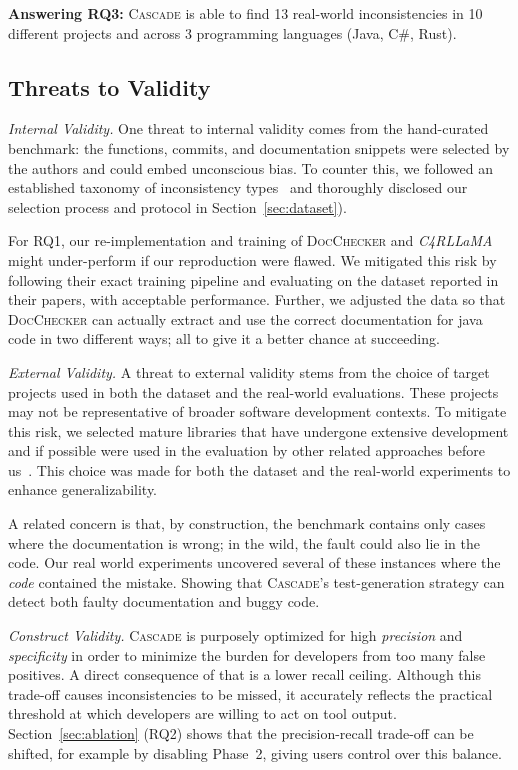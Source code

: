\documentclass[acmsmall, screen]{acmart}
\newcommand{\tool}{\textsc{Cascade}\xspace}
\begin{document}
\begin{tcolorbox}[mystyle]
\textbf{Answering RQ3:} \tool is able to find 13 real-world inconsistencies in 10 different projects and across 3 programming languages (Java, C\#, Rust).
\end{tcolorbox}

\subsection{Threats to Validity}

\emph{Internal Validity.}
One threat to internal validity comes from the hand-curated benchmark: the functions, commits, and documentation snippets were selected by the authors and could embed unconscious bias. To counter this, we followed an established taxonomy of inconsistency types~\cite{wen2019large} and thoroughly disclosed our selection process and protocol in Section~\ref{sec:dataset}).

For RQ1, our re-implementation and training of \textsc{DocChecker} and \textit{C4RLLaMA} might under-perform if our reproduction were flawed. We mitigated this risk by following their exact training pipeline and evaluating on the dataset reported in their papers, with acceptable performance. Further, we adjusted the data so that \textsc{DocChecker} can actually extract and use the correct documentation for java code in two different ways; all to give it a better chance at succeeding. 

\emph{External Validity.}
A threat to external validity stems from the choice of target projects used in both the dataset and the real-world evaluations. These projects may not be representative of broader software development contexts. To mitigate this risk, we selected mature libraries that have undergone extensive development and if possible were used in the evaluation by other related approaches before us~\cite{jdoctor, rustc4}. This choice was made for both the dataset and the real-world experiments to enhance generalizability. 

A related concern is that, by construction, the benchmark contains only cases where the documentation is wrong; in the wild, the fault could also lie in the code. Our real world experiments uncovered several of these instances where the \emph{code} contained the mistake. Showing that \tool's test-generation strategy can detect both faulty documentation and buggy code.

\emph{Construct Validity.}
\tool is purposely optimized for high \emph{precision} and \emph{specificity} in order to minimize the burden for developers from too many false positives. A direct consequence of that is a lower recall ceiling. Although this trade-off causes inconsistencies to be missed, it accurately reflects the practical threshold at which developers are willing to act on tool output. Section~\ref{sec:ablation} (RQ2) shows that the precision-recall trade-off can be shifted, for example by disabling Phase~2, giving users control over this balance.
\end{document}
